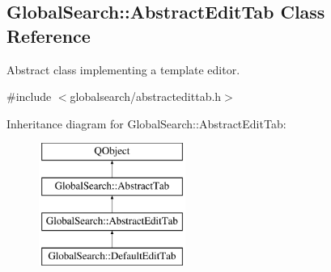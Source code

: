 \hypertarget{classGlobalSearch_1_1AbstractEditTab}{}\subsection{Global\+Search\+:\+:Abstract\+Edit\+Tab Class Reference}
\label{classGlobalSearch_1_1AbstractEditTab}


Abstract class implementing a template editor.  




{\ttfamily \#include $<$globalsearch/abstractedittab.\+h$>$}

Inheritance diagram for Global\+Search\+:\+:Abstract\+Edit\+Tab\+:\begin{figure}[H]
\begin{center}
\leavevmode
\includegraphics[height=4.000000cm]{classGlobalSearch_1_1AbstractEditTab}
\end{center}
\end{figure}
